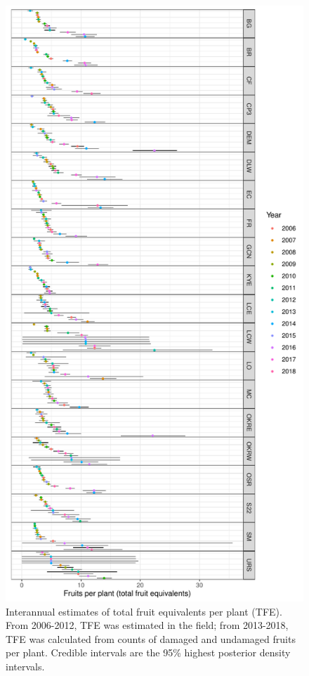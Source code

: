 \documentclass[12pt, oneside]{article}   	%
\begin{document}
 \begin{figure}[!h]
   \centering
       \includegraphics[page=1,height=.95\textheight]{../../figures/interannualTFEfull.pdf}  
    \caption{ Interannual estimates of total fruit equivalents per plant (TFE). From 2006-2012, TFE was estimated in the field; from 2013-2018, TFE was calculated from counts of damaged and undamaged fruits per plant. Credible intervals are the 95\% highest posterior density intervals. }
 \label{fig:viability-estimates-population}
\end{figure}
\end{document}

